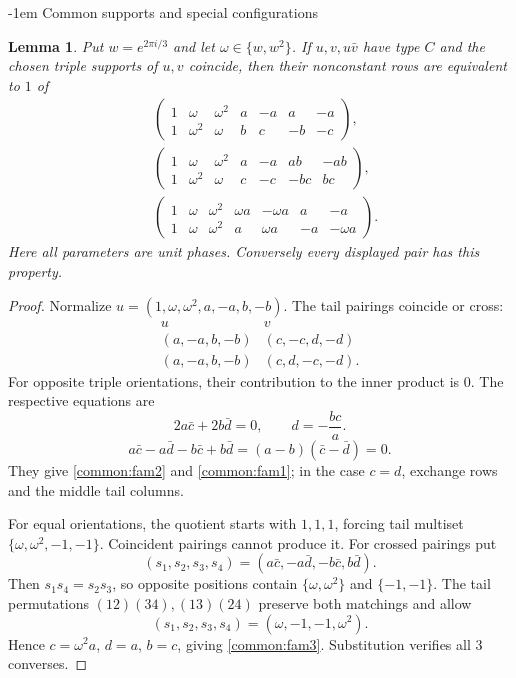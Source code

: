 \documentclass[11pt,a4paper]{article}
\makeatletter
\newtheorem{lemma}[theorem]{Lemma}
\theoremstyle{plain}
\theoremstyle{definition}
\numberwithin{equation}{section}
\renewcommand\subsection{\@startsection{subsection}{2}{\z@}  {\medskipamount}  {-1em}  {\normalfont\normalsize\bfseries}}
\makeatother
\begin{document}
\subsection{Common supports and special configurations}\label{sec:common}\label{sec:examples}
\begin{lemma}\label{common:common}
Put $w=e^{2\pi i/3}$ and let $\omega\in\{w,w^2\}$. If $u,v,u\bar{v}$ have type $C$ and the chosen triple supports of $u,v$ coincide, then their nonconstant rows are equivalent to $1$ of
\begin{align}
&\begin{pmatrix}
1&\omega &\omega ^2&a&-a&a&-a\\
1&\omega ^2&\omega &b&c&-b&-c
\end{pmatrix},\label{common:fam1}\\[5pt]
&\begin{pmatrix}
1&\omega &\omega ^2&a&-a&ab&-ab\\
1&\omega ^2&\omega &c&-c&-bc&bc
\end{pmatrix},\label{common:fam2}\\[5pt]
&\begin{pmatrix}
1&\omega &\omega ^2&\omega a&-\omega a&a&-a\\
1&\omega &\omega ^2&a&\omega a&-a&-\omega a
\end{pmatrix}.\label{common:fam3}
\end{align}
Here all parameters are unit phases. Conversely every displayed pair has this property.
\end{lemma}
\begin{proof}
Normalize $u=(1,\omega,\omega^2,a,-a,b,-b)$. The tail pairings coincide or cross:
$$
\begin{array}{c|c}
u&v\\ \hline
(a,-a,b,-b)&(c,-c,d,-d)\\
(a,-a,b,-b)&(c,d,-c,-d).
\end{array}
$$
For opposite triple orientations, their contribution to the inner product is $0$. The respective equations are
$$
2a\bar{c}+2b\bar{d}=0,
\qquad d=-\frac{bc}{a}.
$$
$$
a\bar{c}-a\bar{d}-b\bar{c}+b\bar{d}
=(a-b)(\bar{c}-\bar{d})=0.
$$
They give \eqref{common:fam2} and \eqref{common:fam1}; in the case $c=d$, exchange rows and the middle tail columns.

For equal orientations, the quotient starts with $1,1,1$, forcing tail multiset $\{\omega,\omega^2,-1,-1\}$. Coincident pairings cannot produce it. For crossed pairings put
$$
(s_1,s_2,s_3,s_4)
=(a\bar{c},-a\bar{d},-b\bar{c},b\bar{d}).
$$
Then $s_1s_4=s_2s_3$, so opposite positions contain $\{\omega,\omega^2\}$ and $\{-1,-1\}$. The tail permutations $(12)(34),(13)(24)$ preserve both matchings and allow
$$
(s_1,s_2,s_3,s_4)=(\omega ,-1,-1,\omega ^2).
$$
Hence $c=\omega^2a$, $d=a$, $b=c$, giving \eqref{common:fam3}. Substitution verifies all $3$ converses.
\end{proof}
\end{document}
